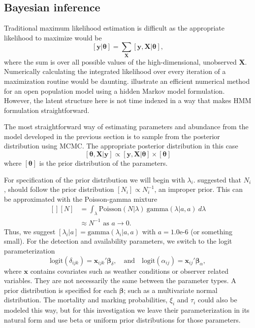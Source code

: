 \documentclass[fleqn,10pt]{wlscirep}
\begin{document}
{\hypertarget{bayesian-inference}{%
\subsection{Bayesian inference}\label{bayesian-inference}}

Traditional maximum likelihood estimation is difficult as the appropriate likelihood to maximize would be
\[
[\mathbf{y}|\boldsymbol{\theta}] = \sum_{\mathbf{X}}[\mathbf{y},\mathbf{X}|\boldsymbol{\theta}], 
\]
where the sum is over all possible values of the high-dimensional, unobserved \(\mathbf{X}\). Numerically calculating the integrated likelihood over every iteration of a maximization routine would be daunting. \cite{cowen2017hidden} illustrate an efficient numerical method for an open population model using a hidden Markov model formulation. However, the latent structure here is not time indexed in a way that makes HMM formulation straightforward.

The most straightforward way of estimating parameters and abundance from the model developed in the previous section is to sample from the posterior distribution using MCMC. The appropriate posterior distribution in this case
\[
[\boldsymbol{\theta}, \mathbf{X}|\mathbf{y}] \propto [\mathbf{y},\mathbf{X}|\boldsymbol{\theta}] \times [\boldsymbol{\theta}]
\]
where \([\boldsymbol{\theta}]\) is the prior distribution of the parameters.

For specification of the prior distribution we will begin with \(\lambda_i\). \cite{link2013cautionary} suggested that \(N_i\), should follow the prior distribution \([N_i]\propto N_i^{-1}\), an improper prior. This can be approximated with the Poisson-gamma mixture
\[
\begin{aligned}[]
[N] &= \int_{\lambda}\text{Poisson}(N|\lambda)\ \text{gamma}(\lambda|a, a)\  d\lambda \\
&\approx N^{-1} \text{ as } a \to 0.
\end{aligned}
\]
Thus, we suggest \([\lambda_i|a] = \text{gamma}(\lambda_i|a, a)\) with \(a=\text{1.0e-6}\) (or something small). For the detection and availability parameters, we switch to the logit parameterization
\[
\text{logit}(\delta_{ijk}) = \mathbf{x}_{ijk}'\boldsymbol{\beta}_\delta, \quad \text{and}\quad  \text{logit}(\alpha_{ij}) = \mathbf{x}_{ij}'\boldsymbol{\beta}_\alpha,
\]
where \(\mathbf{x}\) contains covariates such as weather conditions or observer related variables. They are not necessarily the same between the parameter types. A prior distribution is specified for each \(\boldsymbol{\beta}\); such as a multivariate normal distribution. The mortality and marking probabilities, \(\xi_i\) and \(\tau_i\) could also be modeled this way, but for this investigation we leave their parameterization in its natural form and use beta or uniform prior distributions for those parameters.

}
\end{document}
